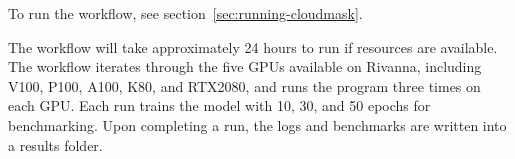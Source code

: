 To run the workflow, see section~\ref{sec:running-cloudmask}.

The workflow will take approximately 24 hours to run if resources are
available. The workflow iterates through the five GPUs available on
Rivanna, including V100, P100, A100, K80, and RTX2080, and runs the program
three times on each GPU. Each run trains the model with 10, 30, and 50
epochs for benchmarking. Upon completing a run, the logs and
benchmarks are written into a results folder.

